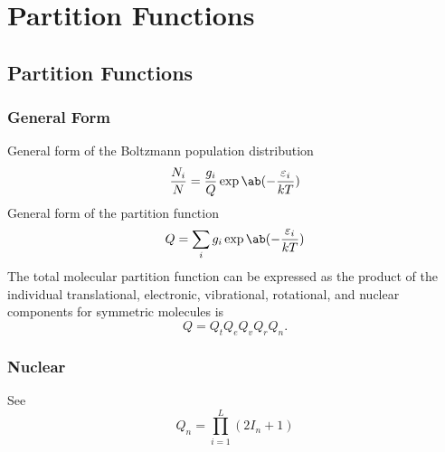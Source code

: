 \chapter{Partition Functions}

\section{Partition Functions}

\subsection{General Form}

General form of the Boltzmann population distribution \cite[8]{hansonSpectroscopyOpticalDiagnostics2016}
\begin{equation*}
    \frac{N_i}{N} = \frac{g_i}{Q}\exp\ab(-\frac{\varepsilon_i}{kT})
\end{equation*}
General form of the partition function \cite[8]{hansonSpectroscopyOpticalDiagnostics2016}
\begin{equation*}
    Q = \sum_i g_i\exp\ab(-\frac{\varepsilon_i}{kT})
\end{equation*}
The total molecular partition function can be expressed as the product of the individual translational, electronic, vibrational, rotational, and nuclear components for symmetric molecules is \cite[80]{hansonSpectroscopyOpticalDiagnostics2016}
\begin{equation*}
    Q = Q_tQ_eQ_vQ_rQ_n.
\end{equation*}

\subsection{Nuclear}

See \cite[81]{hansonSpectroscopyOpticalDiagnostics2016}
\begin{equation*}
    Q_n = \prod_{i = 1}^L (2I_n + 1)
\end{equation*}

